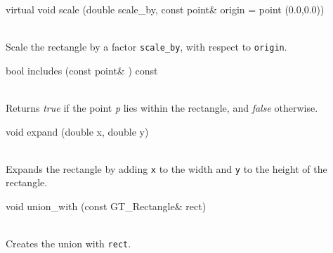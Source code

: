 \documentclass[twoside,fleqn]{report}
\begin{document}
\begin{Cdefinition}
  \item[virtual void scale (double scale\_by,
  const point\& origin = point (0.0,0.0))] \strut\\
  Scale the rectangle by a factor
  \texttt{scale\_by}, with respect to \texttt{origin}.


  \item[bool includes (const point\& \Param{p}) const] \strut\\
  Returns \emph{true} if the point \emph{p} lies within the 
  rectangle, and \emph{false} otherwise.  

  \item[void expand (double x, double y)] \strut\\
  Expands the rectangle by adding \texttt{x} to the width and
  \texttt{y} to the height of the rectangle.

  \item[void union\_with (const GT\_Rectangle\& rect)] \strut\\
  Creates the union with \texttt{rect}.



\end{Cdefinition}
\end{document}
